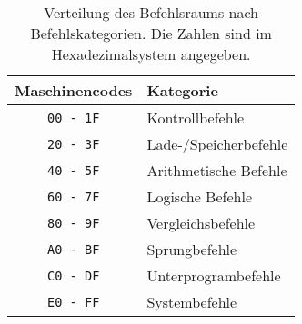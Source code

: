 \begin{table}
  \centering
  \begin{tabular}{|c|l|}                        \hline
    Maschinencodes   & Kategorie              \\\hline\hline
    \texttt{00 - 1F} & Kontrollbefehle        \\
    \texttt{20 - 3F} & Lade-/Speicherbefehle  \\
    \texttt{40 - 5F} & Arithmetische Befehle  \\
    \texttt{60 - 7F} & Logische Befehle       \\
    \texttt{80 - 9F} & Vergleichsbefehle      \\
    \texttt{A0 - BF} & Sprungbefehle          \\
    \texttt{C0 - DF} & Unterprogrambefehle    \\
    \texttt{E0 - FF} & Systembefehle          \\\hline
  \end{tabular}
  \caption[Verteilung des Befehlsraums]
          {Verteilung des Befehlsraums nach Befehlskategorien.
          Die Zahlen sind im Hexadezimalsystem angegeben.}
  \label{tab:Befehlraumverteilung}
\end{table}


